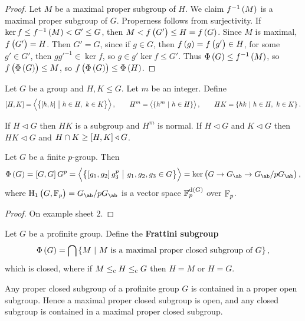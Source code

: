 \begin{proof}
Let $ M $ be a maximal proper subgroup of $ H $. We claim $ f^{-1}\br{M} $ is a maximal proper subgroup of $ G $. Properness follows from surjectivity. If $ \ker f \le f^{-1}\br{M} < G' \le G $, then $ M < f\br{G'} \le H = f\br{G} $. Since $ M $ is maximal, $ f\br{G'} = H $. Then $ G' = G $, since if $ g \in G $, then $ f\br{g} = f\br{g'} \in H $, for some $ g' \in G' $, then $ gg'^{-1} \in \ker f $, so $ g \in g'\ker f \le G' $. Thus $ \Phi\br{G} \le f^{-1}\br{M} $, so $ f\br{\Phi\br{G}} \le M $, so $ f\br{\Phi\br{G}} \le \Phi\br{H} $.
\end{proof}

\begin{definition}
Let $ G $ be a group and $ H, K \le G $. Let $ m $ be an integer. Define
$$ \sbr{H, K} = \abr{\cbr{\sbr{h, k} \st h \in H, \ k \in K}}, \qquad H^m = \abr{\cbr{h^m \st h \in H}}, \qquad HK = \cbr{hk \st h \in H, \ k \in K}. $$
\end{definition}

If $ H \triangleleft G $ then $ HK $ is a subgroup and $ H^m $ is normal. If $ H \triangleleft G $ and $ K \triangleleft G $ then $ HK \triangleleft G $ and $ H \cap K \ge \sbr{H, K} \triangleleft G $.

\begin{proposition}
Let $ G $ be a finite $ p $-group. Then
$$ \Phi\br{G} = \sbr{G, G}G^p = \abr{\cbr{\sbr{g_1, g_2}g_3^p \st g_1, g_2, g_3 \in G}} = \ker \br{G \to G_{\ab} \to G_{\ab} / pG_{\ab}}, $$
where $ \H_1\br{G, \FF_p} = G_{\ab} / pG_{\ab} $ is a vector space $ \FF_p^{\d\br{G}} $ over $ \mathbb{F}_p $.
\end{proposition}

\begin{proof}
On example sheet $ 2 $.
\end{proof}

\pagebreak

\begin{definition}
Let $ G $ be a profinite group. Define the \textbf{Frattini subgroup}
$$ \Phi\br{G} = \bigcap \cbr{M \st M \ \text{is a maximal proper closed subgroup of} \ G}, $$
which is closed, where if $ M \le_{\mathrm{c}} H \le_{\mathrm{c}} G $ then $ H = M $ or $ H = G $.
\end{definition}

\begin{proposition}
Any proper closed subgroup of a profinite group $ G $ is contained in a proper open subgroup. Hence a maximal proper closed subgroup is open, and any closed subgroup is contained in a maximal proper closed subgroup.
\end{proposition}

